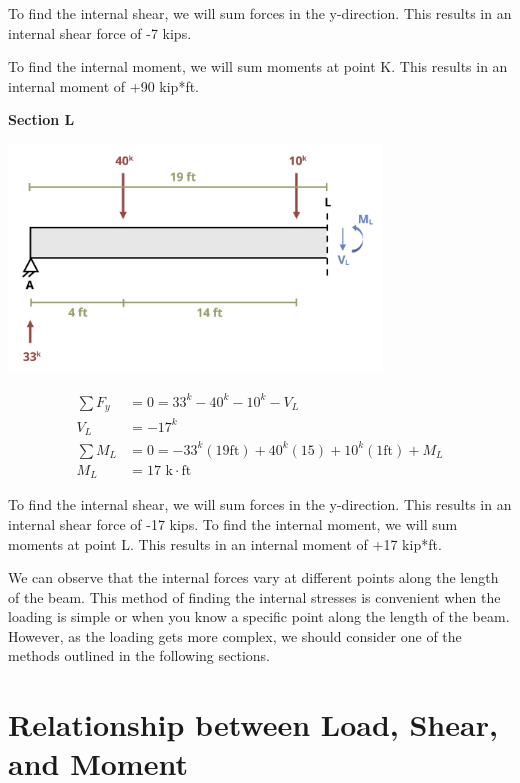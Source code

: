 \documentclass[
  letterpaper,
  DIV=11,
  numbers=noendperiod]{scrreprt}
\begin{document}
\begin{tcolorbox}
To find the internal shear, we will sum forces in the y-direction. This
results in an internal shear force of -7 kips.

To find the internal moment, we will sum moments at point K. This
results in an internal moment of +90 kip*ft.

\textbf{Section L}

\begin{center}
\includegraphics[width=3.90625in,height=\textheight]{images/CH7 PNGs/example 7.1 part 5.png}
\end{center}

\[
\begin{aligned}
\sum F_y&=0=33^k-40^k-10^k-V_L \\
V_L & =-17^k \\
\sum M_L & =0=-33^k(19 \mathrm{ft})+40^k(15)+10^k(1 \mathrm{ft})+M_L \\
M_L & =17 \text{ k} \cdot \mathrm{ft}
\end{aligned}
\]

To find the internal shear, we will sum forces in the y-direction. This
results in an internal shear force of -17 kips. To find the internal
moment, we will sum moments at point L. This results in an internal
moment of +17 kip*ft.

We can observe that the internal forces vary at different points along
the length of the beam. This method of finding the internal stresses is
convenient when the loading is simple or when you know a specific point
along the length of the beam. However, as the loading gets more complex,
we should consider one of the methods outlined in the following
sections.

\end{tcolorbox}

\section{Relationship between Load, Shear, and
Moment}\label{relationship-between-load-shear-and-moment}
\end{document}
